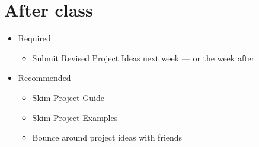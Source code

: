 \documentclass[11pt]{article}
\begin{document}
\section*{After class}

\begin{itemize}
\item Required
\begin{itemize}
\item Submit Revised Project Ideas next week --- or the week after
\end{itemize}
\item Recommended
\begin{itemize}
\item Skim Project Guide
\item Skim Project Examples
\item Bounce around project ideas with friends
\end{itemize}
\end{itemize}



\end{document}
